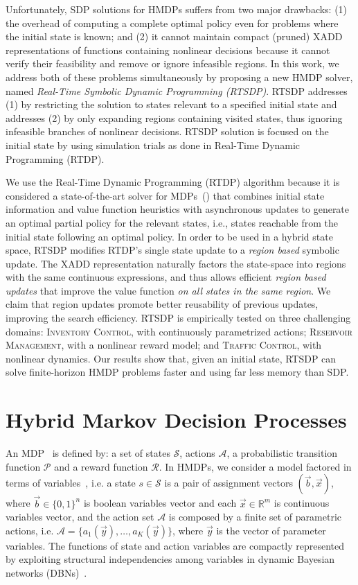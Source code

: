\documentclass[letterpaper]{article}
\newcommand{\Invent}{\textsc{Inventory Control}}
\newcommand{\Traffic}{\textsc{Traffic Control}}
\newcommand{\Reservoir}{\textsc{Reservoir Management}}
\begin{document}
Unfortunately, SDP solutions for HMDPs suffers from two major drawbacks: (1) the overhead of computing a complete optimal policy even for problems where the initial state is known; and (2) it cannot maintain compact (pruned) XADD representations of functions containing nonlinear decisions because it cannot verify their feasibility and remove or ignore infeasible regions.
In this work, we address both of these problems simultaneously by proposing a new HMDP solver, named \emph{Real-Time Symbolic Dynamic Programming (RTSDP)}.
RTSDP addresses (1) by restricting the solution to states relevant to a specified initial state and addresses (2) by only expanding regions containing visited states, thus ignoring infeasible branches of nonlinear decisions. RTSDP solution is focused on the initial state by using simulation trials as done in Real-Time Dynamic Programming (RTDP).

We use the Real-Time Dynamic Programming (RTDP) algorithm because it is considered a state-of-the-art solver for MDPs~(\cite{Barto95RTDP,kolobov12GOURMAND}) that combines initial state information and value function heuristics with asynchronous updates to generate an optimal partial policy for the relevant states, i.e., states reachable from the initial state following an optimal policy.
In order to be used in a hybrid state space, RTSDP modifies RTDP's single state update to a \emph{region based} symbolic update. The XADD representation naturally factors the state-space into regions with the same continuous expressions, and thus allows efficient \emph{region based updates} that improve the value function  \emph{on all states in the same region}. We claim that region updates promote better reusability of previous updates, improving the search efficiency. 
RTSDP is empirically tested on three challenging domains: \Invent, with continuously parametrized actions; \Reservoir, with a nonlinear reward model; and \Traffic, with nonlinear dynamics.
Our results show that, given an initial state, RTSDP can solve finite-horizon HMDP problems faster and using far less memory than SDP.

\section{Hybrid Markov Decision Processes}

An MDP~\cite{puterman94} is defined by: a set of states $\mathcal{S}$, actions $\mathcal{A}$, a probabilistic transition function $\mathcal{P}$ and a reward function $\mathcal{R}$.
In HMDPs, we consider a model factored in terms of variables~\cite{boutilier99}, i.e.
a state $s \in \mathcal{S}$ is a pair of assignment vectors $(\vec{b},\vec{x})$, where $\vec{b} \in \{ 0,1 \}^n$ is boolean variables vector and each $\vec{x} \in \mathbb{R}^m$ is continuous variables vector, and the action set $\mathcal{A}$ is composed by a finite set of parametric actions, i.e. $\mathcal{A} = \{ a_1(\vec{y}), \ldots, a_K(\vec{y})\}$, where $\vec{y}$ is the vector of parameter variables.
The functions of state and action variables are compactly represented by exploiting structural independencies among variables in dynamic Bayesian networks (DBNs)~\cite{dean90DBN}. 
\end{document}
